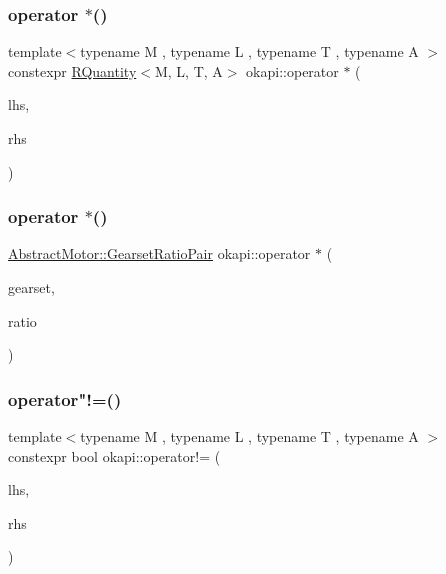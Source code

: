 \subsubsection{\texorpdfstring{operator $\ast$()}{operator *()}\hspace{0.1cm}{\footnotesize\ttfamily [3/4]}}
{\footnotesize\ttfamily template$<$typename M , typename L , typename T , typename A $>$ \\
constexpr \mbox{\hyperlink{classokapi_1_1RQuantity}{R\+Quantity}}$<$M, L, T, A$>$ okapi\+::operator $\ast$ (\begin{DoxyParamCaption}\item[{const \mbox{\hyperlink{classokapi_1_1RQuantity}{R\+Quantity}}$<$ M, L, T, A $>$ \&}]{lhs,  }\item[{const double \&}]{rhs }\end{DoxyParamCaption})}

\mbox{\label{namespaceokapi_ade4f34671410d2b847d7b0366ab60ba1}} 
\subsubsection{\texorpdfstring{operator $\ast$()}{operator *()}\hspace{0.1cm}{\footnotesize\ttfamily [4/4]}}
{\footnotesize\ttfamily \mbox{\hyperlink{structokapi_1_1AbstractMotor_1_1GearsetRatioPair}{Abstract\+Motor\+::\+Gearset\+Ratio\+Pair}} okapi\+::operator $\ast$ (\begin{DoxyParamCaption}\item[{\mbox{\hyperlink{classokapi_1_1AbstractMotor_a88aaa6ea2fa10f5520a537bbf26774d5}{Abstract\+Motor\+::gearset}}}]{gearset,  }\item[{double}]{ratio }\end{DoxyParamCaption})}

\mbox{\label{namespaceokapi_a118add088592d8d0de817c35cff350b2}} 
\subsubsection{\texorpdfstring{operator"!=()}{operator!=()}}
{\footnotesize\ttfamily template$<$typename M , typename L , typename T , typename A $>$ \\
constexpr bool okapi\+::operator!= (\begin{DoxyParamCaption}\item[{const \mbox{\hyperlink{classokapi_1_1RQuantity}{R\+Quantity}}$<$ M, L, T, A $>$ \&}]{lhs,  }\item[{const \mbox{\hyperlink{classokapi_1_1RQuantity}{R\+Quantity}}$<$ M, L, T, A $>$ \&}]{rhs }\end{DoxyParamCaption})}


